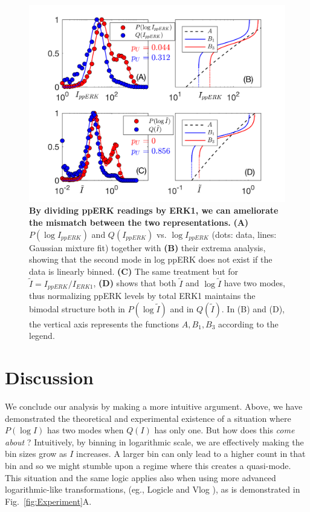 \documentclass[11pt,a4paper,final]{article}
\begin{document}
\smallskip
\begin{figure}
 \centering
   \includegraphics[width=1\linewidth]{Fig5.png}  
  \caption{\textbf{By dividing ppERK readings by ERK1, we can ameliorate the mismatch between the two representations.} \textbf{(A)} $P(\log I_{ppERK})$ and $Q(I_{ppERK})$ vs. $\log I_{ppERK}$ (dots: data, lines: Gaussian mixture fit) together with \textbf{(B)} their extrema analysis, showing that the second mode in log ppERK does not exist if the data is linearly binned. \textbf{(C)} The same treatment but for $\tilde{I} = I_{ppERK}/I_{ERK1}$, \textbf{(D)} shows that both $\tilde{I}$ and $\log \tilde{I}$ have two modes, thus normalizing ppERK levels by total ERK1 maintains the bimodal structure both in $P(\log \tilde{I})$ and in $Q(\tilde{I})$. In (B) and (D), the vertical axis represents the functions $A, B_1,B_3$ according to the legend.}
  \label{fig:NormppERKbyERK}
\end{figure}

\smallskip

\newpage
\section*{Discussion}
We conclude our analysis by making a more intuitive argument. Above, we have demonstrated the theoretical and experimental existence of a situation where $P(\log I)$ has two modes when $Q(I)$ has only one. But how does this \emph{come about} ? Intuitively, by binning in logarithmic scale, we are effectively making the bin sizes grow as $I$ increases. A larger bin can only lead to a higher count in that bin and so we might stumble upon a regime where this creates a quasi-mode. This situation and the same logic applies also when using more advanced logarithmic-like transformations, (eg., Logicle \cite{Parks2006} and Vlog \cite{Bagwell2016} ), as is demonstrated in Fig.~\ref{fig:Experiment}A. 
 
\end{document}
